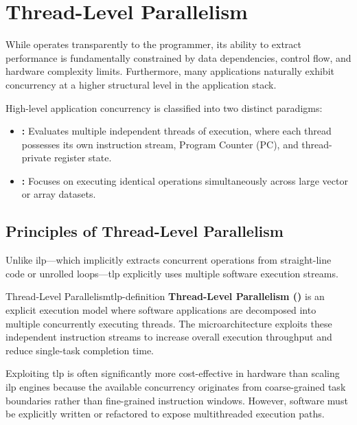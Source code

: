 \chapter{Thread-Level Parallelism}
\label{ch:thread_level_parallelism}

While  operates transparently to the programmer, its ability to extract performance is fundamentally constrained by data dependencies, control flow, and hardware complexity limits. Furthermore, many applications naturally exhibit concurrency at a higher structural level in the application stack. 

High-level application concurrency is classified into two distinct paradigms:
\begin{itemize}
    \item \textbf{:} Evaluates multiple independent threads of execution, where each thread possesses its own instruction stream, Program Counter (PC), and thread-private register state.
    \item \textbf{:} Focuses on executing identical operations simultaneously across large vector or array datasets.
\end{itemize}

\section{Principles of Thread-Level Parallelism}
\label{sec:tlp_principles}

Unlike \gls{ilp}—which implicitly extracts concurrent operations from straight-line code or unrolled loops—\gls{tlp} explicitly uses multiple software execution streams. 

\begin{definition}{Thread-Level Parallelism}{tlp-definition}
    \textbf{Thread-Level Parallelism ()} is an explicit execution model where software applications are decomposed into multiple concurrently executing threads. The microarchitecture exploits these independent instruction streams to increase overall execution throughput and reduce single-task completion time.
\end{definition}

Exploiting \gls{tlp} is often significantly more cost-effective in hardware than scaling \gls{ilp} engines because the available concurrency originates from coarse-grained task boundaries rather than fine-grained instruction windows. However, software must be explicitly written or refactored to expose multithreaded execution paths.


